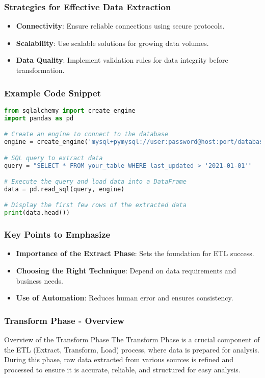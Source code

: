 \documentclass[aspectratio=169]{beamer}
\begin{document}
\begin{frame}[fragile]
  \frametitle{Strategies for Effective Data Extraction}
  \begin{itemize}
      \item \textbf{Connectivity}: Ensure reliable connections using secure protocols.
      \item \textbf{Scalability}: Use scalable solutions for growing data volumes.
      \item \textbf{Data Quality}: Implement validation rules for data integrity before transformation.
  \end{itemize}
\end{frame}

\begin{frame}[fragile]
  \frametitle{Example Code Snippet}
  \begin{lstlisting}[language=Python]
from sqlalchemy import create_engine
import pandas as pd

# Create an engine to connect to the database
engine = create_engine('mysql+pymysql://user:password@host:port/database')

# SQL query to extract data
query = "SELECT * FROM your_table WHERE last_updated > '2021-01-01'"

# Execute the query and load data into a DataFrame
data = pd.read_sql(query, engine)

# Display the first few rows of the extracted data
print(data.head())
  \end{lstlisting}
\end{frame}

\begin{frame}[fragile]
  \frametitle{Key Points to Emphasize}
  \begin{itemize}
      \item \textbf{Importance of the Extract Phase}: Sets the foundation for ETL success.
      \item \textbf{Choosing the Right Technique}: Depend on data requirements and business needs.
      \item \textbf{Use of Automation}: Reduces human error and ensures consistency.
  \end{itemize}
\end{frame}

\begin{frame}[fragile]
    \frametitle{Transform Phase - Overview}
    \begin{block}{Overview of the Transform Phase}
        The Transform Phase is a crucial component of the ETL (Extract, Transform, Load) process, where data is prepared for analysis. During this phase, raw data extracted from various sources is refined and processed to ensure it is accurate, reliable, and structured for easy analysis.
    \end{block}
\end{frame}
\end{document}
